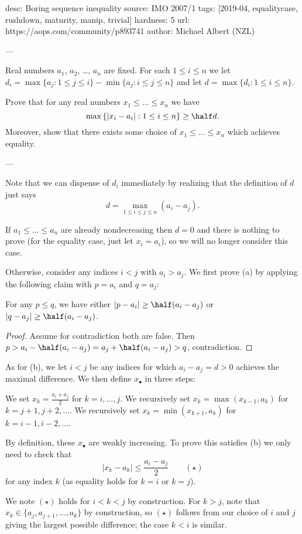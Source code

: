 desc: Boring sequence inequality
source: IMO 2007/1
tags: [2019-04, equalitycase, rushdown, maturity, manip, trivial]
hardness: 5
url: https://aops.com/community/p893741
author: Michael Albert (NZL)

---

Real numbers $a_1$, $a_2$, \dots, $a_n$ are fixed.
For each $1 \le i \le n$ we let
$d_i = \max\{a_j : 1 \le j \le i\} - \min\{a_j : i \le j \le n\}$
and let $d = \max \{d_i : 1 \le i \le n\}$.

\begin{enumerate}[(a)]
  \ii Prove that for any real numbers $x_1 \le \dots \le x_n$ we have
  \[
    \max \left\{ \left\lvert x_i - a_i \right\rvert :
      1 \le i \le n \right\}
      \ge \half d.
  \]
  \ii Moreover, show that there exists some
  choice of $x_1 \le \dots \le x_n$ which achieves equality.
\end{enumerate}

---

Note that we can dispense of $d_i$ immediately
by realizing that the definition of $d$ just says
\[ d = \max_{1 \le i \le j \le n} \left( a_i - a_j \right). \]

If $a_1 \le \dots \le a_n$ are already nondecreasing
then $d = 0$ and there is nothing to prove
(for the equality case, just let $x_i = a_i$),
so we will no longer consider this case.

Otherwise, consider any indices $i < j$ with $a_i > a_j$.
We first prove (a) by applying the following claim
with $p = a_i$ and $q = a_j$:
\begin{claim*}
  For any $p \le q$, we have
  either $|p - a_i| \ge \half(a_i-a_j)$
  or $|q - a_j| \ge \half(a_i-a_j)$.
\end{claim*}
\begin{proof}
  Assume for contradiction both are false.
  Then $p > a_i - \half(a_i-a_j)
  = a_j + \half(a_i-a_j) > q$, contradiction.
\end{proof}

As for (b), we let $i < j$ be any indices for which
$a_i - a_j = d > 0$ achieves the maximal difference.
We then define $x_\bullet$ in three steps:
\begin{itemize}
  \ii We set $x_k = \frac{a_i + a_j}{2}$ for $k = i, \dots, j$.
  \ii We recursively set $x_{k} = \max(x_{k-1}, a_k)$
  for $k = j+1, j+2, \dots$.
  \ii We recursively set $x_{k} = \min(x_{k+1}, a_k)$
  for $k = i-1, i-2, \dots$.
\end{itemize}
By definition, these $x_\bullet$ are weakly increasing.
To prove this satisfies (b) we only need to check that
\[ \left\lvert x_k - a_k \right\rvert \le \frac{a_i-a_j}{2} \qquad
  (\star) \]
for any index $k$ (as equality holds for $k = i$ or $k = j$).

We note $(\star)$ holds for $i < k < j$ by construction.
For $k > j$, note that $x_k \in \{a_j, a_{j+1}, \dots, a_k\}$
by construction, so $(\star)$ follows from our choice of $i$ and $j$
giving the largest possible difference; the case $k < i$ is similar.
